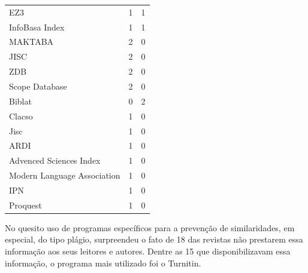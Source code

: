 \documentclass[
  a4paper,
]{book}
\begin{document}
\begin{longtable}[]{@{}lll@{}}
EZ3 & 1 & 1 \\
InfoBasa Index & 1 & 1 \\
MAKTABA & 2 & 0 \\
JISC & 2 & 0 \\
ZDB & 2 & 0 \\
Scope Database & 2 & 0 \\
Biblat & 0 & 2 \\
Clacso & 1 & 0 \\
Jisc & 1 & 0 \\
ARDI & 1 & 0 \\
Advenced Sciences Index & 1 & 0 \\
Modern Language Association & 1 & 0 \\
IPN & 1 & 0 \\
Proquest & 1 & 0 \\
\end{longtable}

No quesito uso de programas específicos para a prevenção de
similaridades, em especial, do tipo plágio, surpreendeu o fato de 18 das
revistas não prestarem essa informação aos seus leitores e autores.
Dentre as 15 que disponibilizavam essa informação, o programa mais
utilizado foi o Turnitin.
\end{document}
